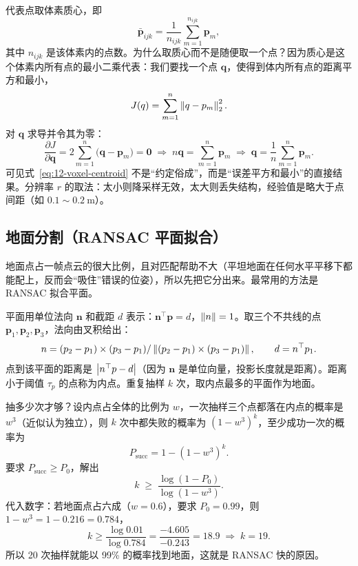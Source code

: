 代表点取体素质心，即
\begin{equation}
\bar{\bm{p}}_{ijk}=\frac{1}{n_{ijk}}\sum_{m=1}^{n_{ijk}}\bm{p}_m ,
\label{eq:12-voxel-centroid}
\end{equation}
其中 $n_{ijk}$ 是该体素内的点数。为什么取质心而不是随便取一个点？因为质心是这个体素内所有点的最小二乘代表：我们要找一个点 $\bm{q}$，使得到体内所有点的距离平方和最小，
\begin{equation}
J(q)=\sum_{m=1}^{n}\left\lVert q-p_m \right\rVert_2^{2}.
\end{equation}
对 $\bm{q}$ 求导并令其为零：
\begin{equation}
\frac{\partial J}{\partial \bm{q}}=2\sum_{m=1}^{n}\big(\bm{q}-\bm{p}_m\big)=\bm{0}
\;\Longrightarrow\;
n\bm{q}=\sum_{m=1}^{n}\bm{p}_m
\;\Longrightarrow\;
\bm{q}=\frac{1}{n}\sum_{m=1}^{n}\bm{p}_m .
\end{equation}
可见式~\eqref{eq:12-voxel-centroid} 不是``约定俗成''，而是``误差平方和最小''的直接结果。分辨率 $r$ 的取法：太小则降采样无效，太大则丢失结构，经验值是略大于点间距（如 $0.1\sim0.2\ \mathrm{m}$）。

\subsection{地面分割（RANSAC 平面拟合）}

地面点占一帧点云的很大比例，且对匹配帮助不大（平坦地面在任何水平平移下都能配上，反而会``吸住''错误的位姿），所以先把它分出来。最常用的方法是 RANSAC 拟合平面。

平面用单位法向 $\bm{n}$ 和截距 $d$ 表示：$\bm{n}^{\top}\bm{p}=d$，$\left\lVert n \right\rVert=1$。取三个不共线的点 $\bm{p}_1,\bm{p}_2,\bm{p}_3$，法向由叉积给出：
\begin{equation}
n=(p_2-p_1)\times(p_3-p_1)/\left\lVert (p_2-p_1)\times(p_3-p_1) \right\rVert,
\qquad d=n^{\top}p_1 .
\label{eq:12-plane}
\end{equation}
点到该平面的距离是 $\left\lvert n^{\top}p-d \right\rvert$（因为 $\bm{n}$ 是单位向量，投影长度就是距离）。距离小于阈值 $\tau_p$ 的点称为内点。重复抽样 $k$ 次，取内点最多的平面作为地面。

抽多少次才够？设内点占全体的比例为 $w$，一次抽样三个点都落在内点的概率是 $w^{3}$（近似认为独立），则 $k$ 次中都失败的概率为 $(1-w^{3})^{k}$，至少成功一次的概率为
\begin{equation}
P_{\mathrm{succ}}=1-(1-w^{3})^{k}.
\end{equation}
要求 $P_{\mathrm{succ}}\ge P_{0}$，解出
\begin{equation}
k\;\ge\;\frac{\log(1-P_{0})}{\log(1-w^{3})}.
\label{eq:12-ransac-k}
\end{equation}
代入数字：若地面点占六成（$w=0.6$），要求 $P_0=0.99$，则 $1-w^{3}=1-0.216=0.784$，
\begin{equation}
k\ge\frac{\log 0.01}{\log 0.784}=\frac{-4.605}{-0.243}=18.9\;\Rightarrow\;k=19 .
\end{equation}
所以 20 次抽样就能以 99\% 的概率找到地面，这就是 RANSAC 快的原因。

